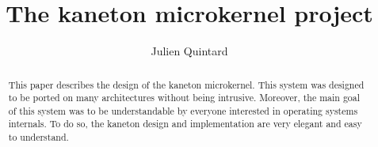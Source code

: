 
%
%



%
%


%
%

\title{The kaneton microkernel project}

%
%

\author{\small{Julien Quintard}}

%
%



%
%

\maketitle

%
%

\begin{abstract}

This paper describes the design of the kaneton microkernel.
This system was designed to be ported on many architectures without being
intrusive. Moreover, the main goal of this system was to be understandable
by everyone interested in operating systems internals. To do so, the kaneton
design and implementation are very elegant and easy to understand.

\end{abstract}

%
%

